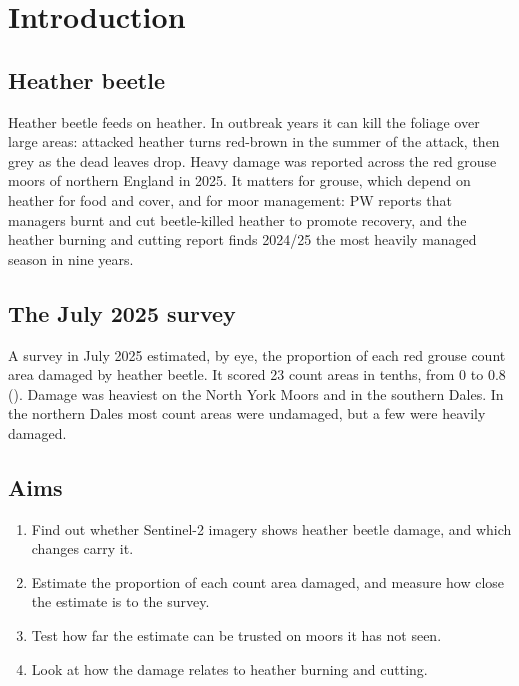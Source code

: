 \documentclass[11pt,a4paper]{article}
\begin{document}
\clearpage
\section{Introduction}\label{sec:intro}

\subsection{Heather beetle}

Heather beetle feeds on heather. In outbreak years it can kill the foliage over large areas: attacked heather turns red-brown in the summer of the attack, then grey as the dead leaves drop. Heavy damage was reported across the red grouse moors of northern England in 2025. It matters for grouse, which depend on heather for food and cover, and for moor management: PW reports that managers burnt and cut beetle-killed heather to promote recovery, and the heather burning and cutting report finds 2024/25 the most heavily managed season in nine years.

\subsection{The July 2025 survey}

A survey in July 2025 estimated, by eye, the proportion of each red grouse count area damaged by heather beetle. It scored 23 count areas in tenths, from 0 to 0.8 (). Damage was heaviest on the North York Moors and in the southern Dales. In the northern Dales most count areas were undamaged, but a few were heavily damaged.

\begin{table}[htbp]
\centering
\caption{The July 2025 survey by GWCT region.}\label{tab:survey}
\small

\end{table}

\subsection{Aims}

\begin{enumerate}
\item Find out whether Sentinel-2 imagery shows heather beetle damage, and which changes carry it.
\item Estimate the proportion of each count area damaged, and measure how close the estimate is to the survey.
\item Test how far the estimate can be trusted on moors it has not seen.
\item Look at how the damage relates to heather burning and cutting.
\end{enumerate}
\end{document}
